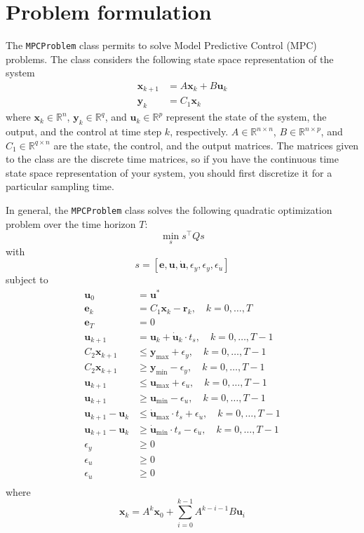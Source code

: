 \documentclass[10pt,a4paper]{article}
\newcommand{\xk}{\ensuremath{\bm{x}_k}\xspace}
\newcommand{\yk}{\ensuremath{\bm{y}_k}\xspace}
\newcommand{\xkk}{\ensuremath{\bm{x}_{k+1}}\xspace}
\newcommand{\xx}[1]{\ensuremath{\bm{x}_{#1}}\xspace}
\newcommand{\uk}{\ensuremath{\bm{u}_k}\xspace}
\newcommand{\ukk}{\ensuremath{\bm{u}_{k+1}}\xspace}
\newcommand{\uu}[1]{\ensuremath{\bm{u}_{#1}}\xspace}
\newcommand{\duk}{\ensuremath{\bm{\dot{u}}_k}\xspace}
\newcommand{\ek}{\ensuremath{\bm{e}_k}\xspace}
\newcommand{\ee}[1]{\ensuremath{\bm{e}_{#1}}\xspace}
\newcommand{\rk}{\ensuremath{\bm{r}_k}\xspace}
\newcommand{\ymin}{\ensuremath{\bm{y}_\text{min}}\xspace}
\newcommand{\ymax}{\ensuremath{\bm{y}_\text{max}}\xspace}
\newcommand{\umin}{\ensuremath{\bm{u}_\text{min}}\xspace}
\newcommand{\umax}{\ensuremath{\bm{u}_\text{max}}\xspace}
\newcommand{\dumin}{\ensuremath{\bm{\dot{u}}_\text{min}}\xspace}
\newcommand{\dumax}{\ensuremath{\bm{\dot{u}}_\text{max}}\xspace}
\newcommand{\epsy}{\ensuremath{\epsilon_{y}}\xspace}
\newcommand{\epsu}{\ensuremath{\epsilon_{u}}\xspace}
\newcommand{\epsdu}{\ensuremath{\epsilon_{\dot{u}}}\xspace}
\newcommand{\code}[1]{\texttt{#1}\xspace}
\newcommand{\R}{\ensuremath{\mathbb{R}\xspace}}
\newcommand{\ts}{\ensuremath{t_s}}
\newcommand{\Co}{\ensuremath{C_1}}
\newcommand{\Cc}{\ensuremath{C_2}}
\begin{document}
\section{Problem formulation}

The \code{MPCProblem} class permits to solve Model Predictive Control (MPC) problems.
The class considers the following state space representation of the system
\begin{align}
    \xkk &= A\xk + B\uk\\
    \yk &= \Co\xk
\end{align}
where $\xk \in \R^n$, $\yk \in \R^q$, and $\uk \in \R^p$ represent the state of the system, the output, and the control at time step $k$, respectively.
$A \in \R^{n \times n}$, $B \in \R^{n \times p}$, and $\Co \in \R^{q \times n}$ are the state, the control, and the output matrices.
The matrices given to the class are the discrete time matrices, so if you have the continuous time state space representation of your system, you should first discretize it for a particular sampling time.

In general, the \code{MPCProblem} class solves the following quadratic optimization problem over the time horizon $T$:
\begin{equation}
    \label{eq:min}
    \min_s s^\intercal Q s
\end{equation}
with
\begin{equation}
    \label{eq:s}
    s = [\bm{e}, \bm{u}, \bm{\dot{u}}, \epsy, \epsy, \epsdu]
\end{equation}
subject to
\begin{align}
    \uu{0} &= \bm{u}^* \label{eq:u0}\\
    \ek &= \Co\xk - \rk,\quad k = 0,\dots,T \label{eq:error}\\
    \ee{T} &= 0 \label{eq:terminal}\\
    \ukk &= \uk + \duk \cdot \ts,\quad k = 0,\dots,T-1 \label{eq:duk}\\
    \Cc\xkk &\leq \ymax + \epsy,\quad k = 0,\dots,T-1 \label{eq:ymax}\\
    \Cc\xkk &\geq \ymin - \epsy,\quad k = 0,\dots,T-1 \label{eq:ymin}\\
    \ukk &\leq \umax + \epsu,\quad k = 0,\dots,T-1 \label{eq:umax}\\
    \ukk &\geq \umin - \epsu,\quad k = 0,\dots,T-1 \label{eq:umin}\\
    \ukk - \uk &\leq \dumax\cdot\ts + \epsdu,\quad k = 0,\dots,T-1 \label{eq:dumax}\\
    \ukk - \uk &\geq \dumin\cdot\ts - \epsdu,\quad k = 0,\dots,T-1 \label{eq:dumin}\\
    \epsy &\geq 0 \label{eq:epsy}\\
    \epsu &\geq 0 \label{eq:epsu}\\
    \epsdu &\geq 0 \label{eq:epsdu}\\
\end{align}
where
\begin{equation}
    \label{eq:xk}
    \xk = A^{k} \xx{0} + \sum_{i=0}^{k-1} A^{k-i-1}B \uu{i}
\end{equation}
\end{document}
